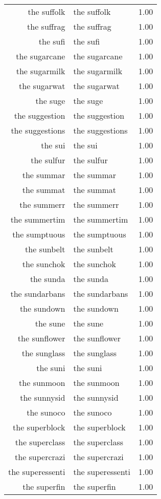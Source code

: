 \begin{table}[ht]
\begin{tabular}{rlr}
  the suffolk & the suffolk & 1.00 \\ 
  the suffrag & the suffrag & 1.00 \\ 
  the sufi & the sufi & 1.00 \\ 
  the sugarcane & the sugarcane & 1.00 \\ 
  the sugarmilk & the sugarmilk & 1.00 \\ 
  the sugarwat & the sugarwat & 1.00 \\ 
  the suge & the suge & 1.00 \\ 
  the suggestion & the suggestion & 1.00 \\ 
  the suggestions & the suggestions & 1.00 \\ 
  the sui & the sui & 1.00 \\ 
  the sulfur & the sulfur & 1.00 \\ 
  the summar & the summar & 1.00 \\ 
  the summat & the summat & 1.00 \\ 
  the summerr & the summerr & 1.00 \\ 
  the summertim & the summertim & 1.00 \\ 
  the sumptuous & the sumptuous & 1.00 \\ 
  the sunbelt & the sunbelt & 1.00 \\ 
  the sunchok & the sunchok & 1.00 \\ 
  the sunda & the sunda & 1.00 \\ 
  the sundarbans & the sundarbans & 1.00 \\ 
  the sundown & the sundown & 1.00 \\ 
  the sune & the sune & 1.00 \\ 
  the sunflower & the sunflower & 1.00 \\ 
  the sunglass & the sunglass & 1.00 \\ 
  the suni & the suni & 1.00 \\ 
  the sunmoon & the sunmoon & 1.00 \\ 
  the sunnysid & the sunnysid & 1.00 \\ 
  the sunoco & the sunoco & 1.00 \\ 
  the superblock & the superblock & 1.00 \\ 
  the superclass & the superclass & 1.00 \\ 
  the supercrazi & the supercrazi & 1.00 \\ 
  the superessenti & the superessenti & 1.00 \\ 
  the superfin & the superfin & 1.00 \\ 

\end{tabular}
\end{table}
